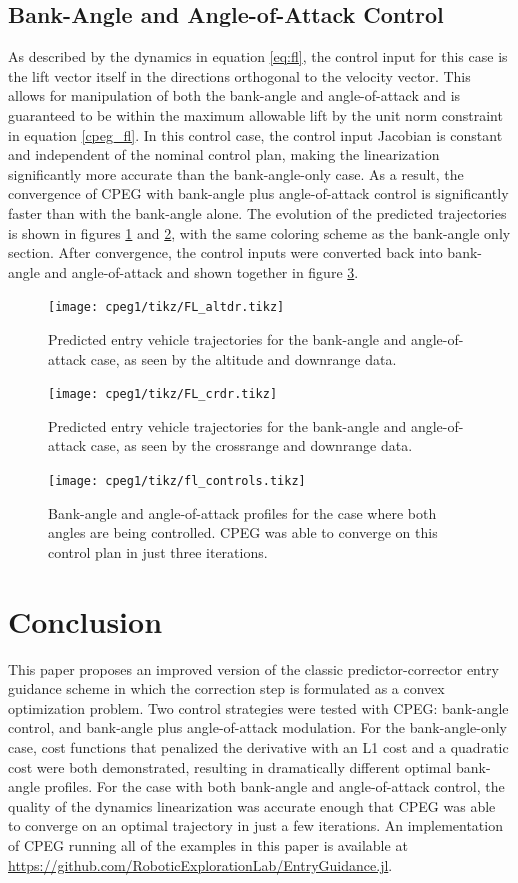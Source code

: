\subsection{Bank-Angle and Angle-of-Attack Control}
As described by the dynamics in equation \eqref{eq:fl}, the control input for this case is the lift vector itself in the directions orthogonal to the velocity vector. This allows for manipulation of both the bank-angle and angle-of-attack and is guaranteed to be within the maximum allowable lift by the unit norm constraint in equation \eqref{cpeg_fl}. In this control case, the control input Jacobian is constant and independent of the nominal control plan, making the linearization significantly more accurate than the bank-angle-only case. As a result, the convergence of CPEG with bank-angle plus angle-of-attack control is significantly faster than with the bank-angle alone. The evolution of the predicted trajectories is shown in figures \ref{fig:flalt} and \ref{fig:flcrdr}, with the same coloring scheme as the bank-angle only section. After convergence, the control inputs were converted back into bank-angle and angle-of-attack and shown together in figure \ref{fig:flcontrols}.
\begin{figure}
    \centering
    \texttt{[image: cpeg1/tikz/FL\_altdr.tikz]}
    \caption{Predicted entry vehicle trajectories for the bank-angle and angle-of-attack case, as seen by the altitude and downrange data.}
    \label{fig:flalt}
\end{figure}
\begin{figure}
    \centering
    \texttt{[image: cpeg1/tikz/FL\_crdr.tikz]}
    \caption{Predicted entry vehicle trajectories for the bank-angle and angle-of-attack case, as seen by the crossrange and downrange data.}
    \label{fig:flcrdr}
\end{figure}
\begin{figure}
    \centering
    \texttt{[image: cpeg1/tikz/fl\_controls.tikz]}
    \caption{Bank-angle and angle-of-attack profiles for the case where both angles are being controlled. CPEG was able to converge on this control plan in just three iterations.}
    \label{fig:flcontrols}
\end{figure}
\section{Conclusion}
\label{sec:cpeg1:conclusion}
This paper proposes an improved version of the classic predictor-corrector entry guidance scheme in which the correction step is formulated as a convex optimization problem. Two control strategies were tested with CPEG: bank-angle control, and bank-angle plus angle-of-attack modulation. For the bank-angle-only case, cost functions that penalized the derivative with an L1 cost and a quadratic cost were both demonstrated, resulting in dramatically different optimal bank-angle profiles. For the case with both bank-angle and angle-of-attack control, the quality of the dynamics linearization was accurate enough that CPEG was able to converge on an optimal trajectory in just a few iterations. An implementation of CPEG running all of the examples in this paper is available at \url{https://github.com/RoboticExplorationLab/EntryGuidance.jl}.